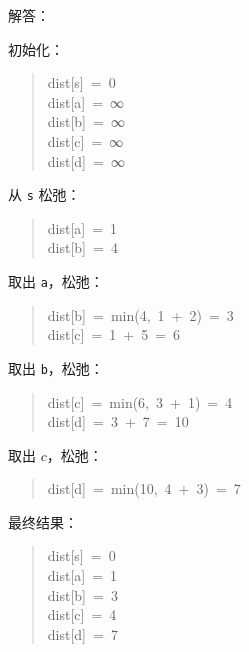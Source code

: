 \documentclass[UTF8,zihao=-4]{ctexart}
\begin{document}
解答：

初始化：

\begin{quote}
\small\ttfamily\raggedright
\relax dist[s]\ =\ 0\\
\relax dist[a]\ =\ ∞\\
\relax dist[b]\ =\ ∞\\
\relax dist[c]\ =\ ∞\\
\relax dist[d]\ =\ ∞\\
\end{quote}

从 \texttt{s} 松弛：

\begin{quote}
\small\ttfamily\raggedright
\relax dist[a]\ =\ 1\\
\relax dist[b]\ =\ 4\\
\end{quote}

取出 \texttt{a}，松弛：

\begin{quote}
\small\ttfamily\raggedright
\relax dist[b]\ =\ min(4,\ 1\ +\ 2)\ =\ 3\\
\relax dist[c]\ =\ 1\ +\ 5\ =\ 6\\
\end{quote}

取出 \texttt{b}，松弛：

\begin{quote}
\small\ttfamily\raggedright
\relax dist[c]\ =\ min(6,\ 3\ +\ 1)\ =\ 4\\
\relax dist[d]\ =\ 3\ +\ 7\ =\ 10\\
\end{quote}

取出 $c$，松弛：

\begin{quote}
\small\ttfamily\raggedright
\relax dist[d]\ =\ min(10,\ 4\ +\ 3)\ =\ 7\\
\end{quote}

最终结果：

\begin{quote}
\small\ttfamily\raggedright
\relax dist[s]\ =\ 0\\
\relax dist[a]\ =\ 1\\
\relax dist[b]\ =\ 3\\
\relax dist[c]\ =\ 4\\
\relax dist[d]\ =\ 7\\
\end{quote}
\end{document}
